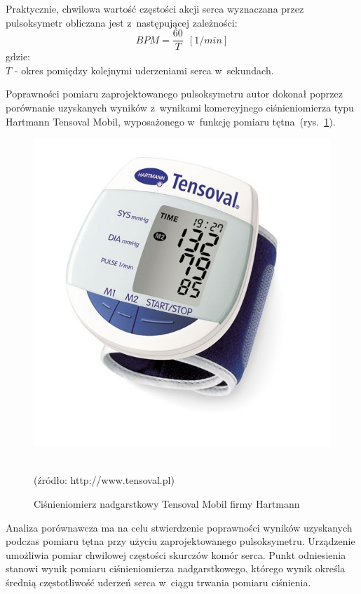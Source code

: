 Praktycznie, chwilowa wartość częstości akcji serca wyznaczana przez pulsoksymetr obliczana jest z~następującej zależności:
\begin{equation}
	BPM = \frac{60}{T}~~[1/min]
\end{equation}
gdzie:\\
$T$ - okres pomiędzy kolejnymi uderzeniami serca w~sekundach.

Poprawności pomiaru zaprojektowanego pulsoksymetru autor dokonał poprzez porównanie uzyskanych wyników z~wynikami komercyjnego ciśnieniomierza typu Hartmann Tensoval Mobil,
wyposażonego w~funkcję pomiaru tętna~(rys.~\ref{rys:tensoval}).
\begin{figure}[!ht]
	\centerline{\includegraphics[scale = 0.38]{graphic/tensoval}}
	\caption{Ciśnieniomierz nadgarstkowy Tensoval Mobil firmy Hartmann}
	~\\
	(źródło: http://www.tensoval.pl)
	\label{rys:tensoval}
\end{figure}

Analiza porównawcza ma na celu stwierdzenie poprawności wyników uzyskanych podczas pomiaru tętna przy użyciu zaprojektowanego pulsoksymetru. Urządzenie
umożliwia pomiar chwilowej częstości skurczów komór serca. Punkt odniesienia stanowi wynik pomiaru ciśnieniomierza nadgarstkowego, którego wynik 
określa średnią częstotliwość uderzeń serca w~ciągu trwania pomiaru ciśnienia.

